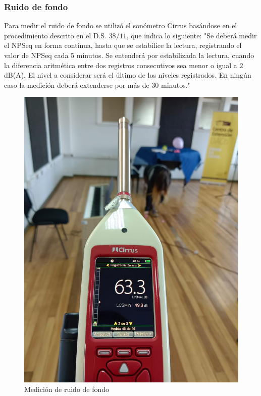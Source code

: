 \subsubsection{Ruido de fondo}
\noindent Para medir el ruido de fondo se utilizó el sonómetro Cirrus basándose en el 
procedimiento descrito en el D.S. $38/11$, que indica lo siguiente: 
"Se deberá medir el NPSeq en forma continua, hasta que se estabilice la lectura, 
registrando el valor de NPSeq cada 5 minutos. Se entenderá por estabilizada la lectura, 
cuando la diferencia aritmética entre dos registros consecutivos sea menor o igual a $2$ dB(A). 
El nivel a considerar será el último de los niveles registrados. En ningún caso la medición 
deberá extenderse por más de 30 minutos."\cite{ds:ds38}
\begin{figure}[H]
    \centering
    \includegraphics[scale=0.15]{Imagenes/mediciones/medicionRDF.jpeg}
    \caption{Medición de ruido de fondo}
    \label{fig: medicionRDF}
\end{figure}
